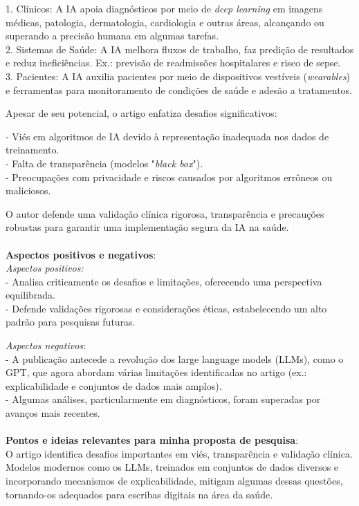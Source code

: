 \documentclass[
	article,
	11pt,
	oneside,
	a4paper,
	english,
	brazil,
	sumario=tradicional
	]{abntex2}
\begin{document}
\begin{enumerate}
    1. Clínicos: A IA apoia diagnósticos por meio de \textit{deep learning} em imagens médicas, patologia, dermatologia, cardiologia e outras áreas, alcançando ou superando a precisão humana em algumas tarefas.\\
    2. Sistemas de Saúde: A IA melhora fluxos de trabalho, faz predição de resultados e reduz ineficiências. Ex.: previsão de readmissões hospitalares e risco de sepse. \\
    3. Pacientes: A IA auxilia pacientes por meio de dispositivos vestíveis (\textit{wearables}) e ferramentas para monitoramento de condições de saúde e adesão a tratamentos.

Apesar de seu potencial, o artigo enfatiza desafios significativos:

- Viés em algoritmos de IA devido à representação inadequada nos dados de treinamento.\\
- Falta de transparência (modelos "\textit{black box}"). \\
- Preocupações com privacidade e riscos causados por algoritmos errôneos ou maliciosos.

O autor defende uma validação clínica rigorosa, transparência e precauções robustas para garantir uma implementação segura da IA na saúde.
\\ \\
\textbf{Aspectos positivos e negativos}:\\
\textit{Aspectos positivos:} \\
- Analisa criticamente os desafios e limitações, oferecendo uma perspectiva equilibrada.\\
- Defende validações rigorosas e considerações éticas, estabelecendo um alto padrão para pesquisas futuras.

\textit{Aspectos negativos}:\\
- A publicação antecede a revolução dos large language models (LLMs), como o GPT, que agora abordam várias limitações identificadas no artigo (ex.: explicabilidade e conjuntos de dados mais amplos).\\
- Algumas análises, particularmente em diagnósticos, foram superadas por avanços mais recentes.
\\ \\
\textbf{Pontos e ideias relevantes para minha proposta de pesquisa}:\\
O artigo identifica desafios importantes em viés, transparência e validação clínica. Modelos modernos como os LLMs, treinados em conjuntos de dados diversos e incorporando mecanismos de explicabilidade, mitigam algumas dessas questões, tornando-os adequados para escribas digitais na área da saúde.


\end{enumerate}
\end{document}

